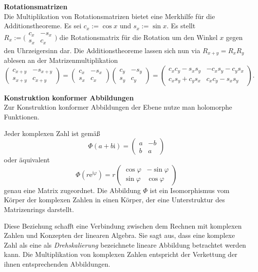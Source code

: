 \documentclass[paper=180mm:225mm,pagesize=auto,fleqn,twoside,11pt,dvipdfmx]{scrartcl}
\theoremstyle{rmbox}
\newenvironment{Rezept}[1]{\strong{#1}\\}{}
\newcommand{\strong}[1]{\textsf{\textbf{#1}}}
\newcommand{\ee}{\mathrm{e}}
\newcommand{\ui}{\mathrm{i}}
\begin{document}
\begin{Rezept}{Rotationsmatrizen}
Die Multiplikation von Rotationsmatrizen bietet eine Merkhilfe
für die Additionstheoreme.
\end{Rezept}
Es sei $c_x := \cos x$ und $s_x := \sin x$. Es stellt
$R_x := \big(\begin{smallmatrix}
c_x & -s_x\\ s_x & c_x
\end{smallmatrix}\big)$ die
Rotationsmatrix für die Rotation um den Winkel $x$ gegen den
Uhrzeigersinn dar. Die Additionstheoreme lassen sich nun
via $R_{x+y} = R_x R_y$ ablesen an der Matrizenmultiplikation
\[\begin{pmatrix}
c_{x+y} & -s_{x+y}\\
s_{x+y} & c_{x+y}
\end{pmatrix} = \begin{pmatrix}
c_x & -s_x\\
s_x & c_x
\end{pmatrix}\begin{pmatrix}
c_y & -s_y\\
s_y & c_y
\end{pmatrix} = \begin{pmatrix}
c_x c_y - s_x s_y & -c_x s_y - c_y s_x\\
c_x s_y + c_y s_x & c_x c_y - s_x s_y
\end{pmatrix}.\]

\begin{Rezept}{Konstruktion konformer Abbildungen}
Zur Konstruktion konformer Abbildungen der Ebene
nutze man holomorphe Funktionen.
\end{Rezept}

\noindent
Jeder komplexen Zahl ist gemäß
\[\Phi(a+b\ui) = \begin{pmatrix}a & -b\\ b & a\end{pmatrix}\]
oder äquivalent
\[\Phi(r\ee^{\ui\varphi}) = r\begin{pmatrix}
\cos\varphi & -\sin\varphi\\
\sin\varphi & \cos\varphi
\end{pmatrix}\]
genau eine Matrix zugeordnet. Die Abbildung $\Phi$ ist ein
Isomorphismus vom Körper der komplexen Zahlen in einen Körper,
der eine Unterstruktur des Matrizenrings darstellt.

Diese Beziehung schafft eine Verbindung zwischen dem
Rechnen mit komplexen Zahlen und Konzepten der linearen Algebra.
Sie sagt aus, dass eine komplexe Zahl als eine als \emph{Drehskalierung}
bezeichnete lineare Abbildung betrachtet werden kann. Die Multiplikation
von komplexen Zahlen entspricht der Verkettung der ihnen entsprechenden
Abbildungen.
\end{document}

